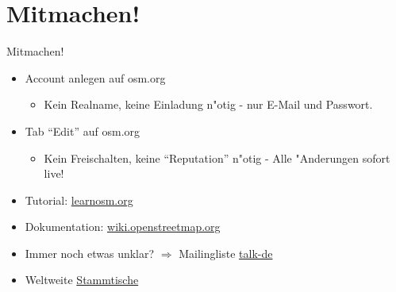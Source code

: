 \documentclass{beamer}
\begin{document}
\section{Mitmachen!}


\begin{frame}{Mitmachen!}
\begin{itemize}
  \item Account anlegen auf osm.org
	\begin{itemize}
		\item Kein Realname, keine Einladung n"otig - nur E-Mail und Passwort.
	\end{itemize}
  \item Tab "`Edit"' auf osm.org
	\begin{itemize}
		\item Kein Freischalten, keine "`Reputation"' n"otig - Alle "Anderungen sofort live!
	\end{itemize}
  \item Tutorial:  \href{http://learnosm.org/}{learnosm.org} 
  \item Dokumentation: \href{http://wiki.openstreetmap.org}{wiki.openstreetmap.org}
  \item Immer noch etwas unklar? $\Rightarrow$ Mailingliste \href{http://lists.openstreetmap.org/listinfo/talk-de}{talk-de}
  \item Weltweite \href{http://usergroups.openstreetmap.de/}{Stammtische}
\end{itemize}

\end{frame}
\end{document}
